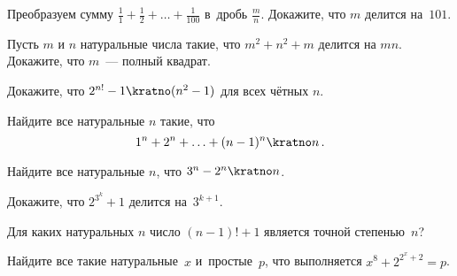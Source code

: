


\begin{problems}

\item
Преобразуем сумму $\frac{1}{1} + \frac{1}{2} + \ldots + \frac{1}{100}$
в~дробь $\frac{m}{n}$.
Докажите, что $m$ делится на~$101$.

\item
Пусть $m$ и $n$ натуральные числа такие, что $m^2 + n^2 + m$ делится на $m n$.
Докажите, что $m$~--- полный квадрат.

\item
Докажите, что $2^{n!} - 1 \kratno (n^2 - 1)$ для всех чётных $n$.

\item
Найдите все натуральные $n$ такие, что
\[
    1^{n} + 2^{n} + \ldots + (n - 1)^{n} \kratno n
\, . \]

\item
Найдите все натуральные $n$, что $3^{n} - 2^{n} \kratno n$.

\item
Докажите, что $2^{3^{k}} + 1$ делится на~$3^{k+1}$.

\item
Для каких натуральных $n$ число $(n - 1)! + 1$ является точной степенью~$n$?

\item
Найдите все такие натуральные~$x$ и~простые~$p$, что выполняется
$x^8 + 2^{2^{x} + 2} = p$.



\end{problems}
